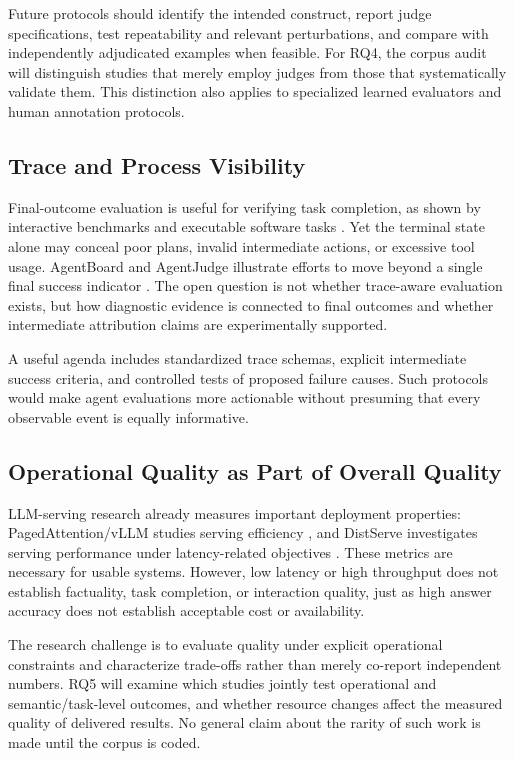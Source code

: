 Future protocols should identify the intended construct, report judge specifications, test repeatability and relevant perturbations, and compare with independently adjudicated examples when feasible. For RQ4, the corpus audit will distinguish studies that merely employ judges from those that systematically validate them. This distinction also applies to specialized learned evaluators and human annotation protocols.

\subsection{Trace and Process Visibility}

Final-outcome evaluation is useful for verifying task completion, as shown by interactive benchmarks and executable software tasks \cite{jimenez2024swebench,zhou2024webarena}. Yet the terminal state alone may conceal poor plans, invalid intermediate actions, or excessive tool usage. AgentBoard and AgentJudge illustrate efforts to move beyond a single final success indicator \cite{ma2024agentboard,zhuge2025agentjudge}. The open question is not whether trace-aware evaluation exists, but how diagnostic evidence is connected to final outcomes and whether intermediate attribution claims are experimentally supported.

A useful agenda includes standardized trace schemas, explicit intermediate success criteria, and controlled tests of proposed failure causes. Such protocols would make agent evaluations more actionable without presuming that every observable event is equally informative.

\subsection{Operational Quality as Part of Overall Quality}

LLM-serving research already measures important deployment properties: PagedAttention/vLLM studies serving efficiency \cite{kwon2023vllm}, and DistServe investigates serving performance under latency-related objectives \cite{zhong2024distserve}. These metrics are necessary for usable systems. However, low latency or high throughput does not establish factuality, task completion, or interaction quality, just as high answer accuracy does not establish acceptable cost or availability.

The research challenge is to evaluate quality under explicit operational constraints and characterize trade-offs rather than merely co-report independent numbers. RQ5 will examine which studies jointly test operational and semantic/task-level outcomes, and whether resource changes affect the measured quality of delivered results. No general claim about the rarity of such work is made until the corpus is coded.

